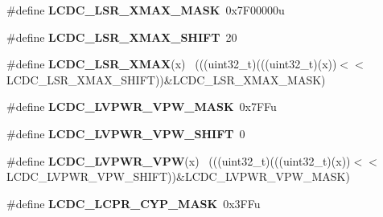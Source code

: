\begin{DoxyCompactItemize}
\item 
\hypertarget{group___l_c_d_c___register___masks_ga1661ab9d880016c7927337adb4cd9fcf}{}\#define {\bfseries L\+C\+D\+C\+\_\+\+L\+S\+R\+\_\+\+X\+M\+A\+X\+\_\+\+M\+A\+S\+K}~0x7\+F00000u\label{group___l_c_d_c___register___masks_ga1661ab9d880016c7927337adb4cd9fcf}

\item 
\hypertarget{group___l_c_d_c___register___masks_ga51aabf5a7ec2d9f8375009100151932c}{}\#define {\bfseries L\+C\+D\+C\+\_\+\+L\+S\+R\+\_\+\+X\+M\+A\+X\+\_\+\+S\+H\+I\+F\+T}~20\label{group___l_c_d_c___register___masks_ga51aabf5a7ec2d9f8375009100151932c}

\item 
\hypertarget{group___l_c_d_c___register___masks_ga04b59d0a3ba9913bd56de493fb451d3e}{}\#define {\bfseries L\+C\+D\+C\+\_\+\+L\+S\+R\+\_\+\+X\+M\+A\+X}(x)                                              ~(((uint32\+\_\+t)(((uint32\+\_\+t)(x))$<$$<$L\+C\+D\+C\+\_\+\+L\+S\+R\+\_\+\+X\+M\+A\+X\+\_\+\+S\+H\+I\+F\+T))\&L\+C\+D\+C\+\_\+\+L\+S\+R\+\_\+\+X\+M\+A\+X\+\_\+\+M\+A\+S\+K)\label{group___l_c_d_c___register___masks_ga04b59d0a3ba9913bd56de493fb451d3e}

\item 
\hypertarget{group___l_c_d_c___register___masks_ga97a3b9c0b405d6143a308bac2e246705}{}\#define {\bfseries L\+C\+D\+C\+\_\+\+L\+V\+P\+W\+R\+\_\+\+V\+P\+W\+\_\+\+M\+A\+S\+K}~0x7\+F\+Fu\label{group___l_c_d_c___register___masks_ga97a3b9c0b405d6143a308bac2e246705}

\item 
\hypertarget{group___l_c_d_c___register___masks_ga50e22255da48134381e33ba1e7637c8d}{}\#define {\bfseries L\+C\+D\+C\+\_\+\+L\+V\+P\+W\+R\+\_\+\+V\+P\+W\+\_\+\+S\+H\+I\+F\+T}~0\label{group___l_c_d_c___register___masks_ga50e22255da48134381e33ba1e7637c8d}

\item 
\hypertarget{group___l_c_d_c___register___masks_ga20a2486f40719bc1befeb43c9282495e}{}\#define {\bfseries L\+C\+D\+C\+\_\+\+L\+V\+P\+W\+R\+\_\+\+V\+P\+W}(x)                                            ~(((uint32\+\_\+t)(((uint32\+\_\+t)(x))$<$$<$L\+C\+D\+C\+\_\+\+L\+V\+P\+W\+R\+\_\+\+V\+P\+W\+\_\+\+S\+H\+I\+F\+T))\&L\+C\+D\+C\+\_\+\+L\+V\+P\+W\+R\+\_\+\+V\+P\+W\+\_\+\+M\+A\+S\+K)\label{group___l_c_d_c___register___masks_ga20a2486f40719bc1befeb43c9282495e}

\item 
\hypertarget{group___l_c_d_c___register___masks_gaf79335696c1fa3db53049da9391551ef}{}\#define {\bfseries L\+C\+D\+C\+\_\+\+L\+C\+P\+R\+\_\+\+C\+Y\+P\+\_\+\+M\+A\+S\+K}~0x3\+F\+Fu\label{group___l_c_d_c___register___masks_gaf79335696c1fa3db53049da9391551ef}


\end{DoxyCompactItemize}
